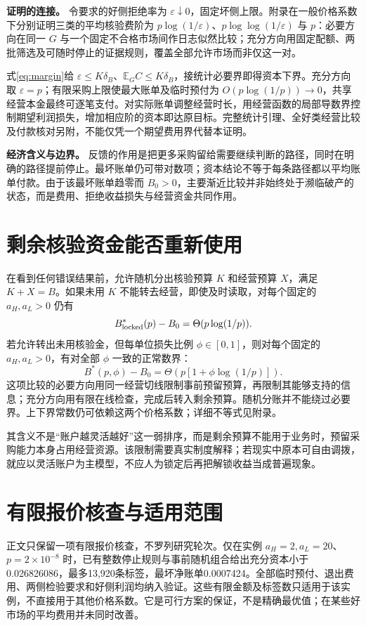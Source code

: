 \documentclass[UTF8,fontset=windows,11pt,a4paper]{ctexart}
\numberwithin{equation}{section}
\begin{document}
\noindent\textbf{证明的连接。}
令要求的好侧拒绝率为 $\varepsilon\downarrow0$，固定坏侧上限。附录在一般价格系数下分别证明三类的平均核验费阶为 $p\log(1/\varepsilon)$、$p\log\log(1/\varepsilon)$ 与 $p$：必要方向在同一 $G$ 与一个固定不合格市场间作日志似然比较；充分方向用固定配额、两批筛选及可随时停止的证据规则，覆盖全部允许市场而非仅这一对。

式\eqref{eq:margin}给 $\varepsilon\le K\delta_B$、$\mathbb E_GC\le K\delta_B$，接统计必要界即得资本下界。充分方向取 $\varepsilon=p$；有限采购上限使最大账单及临时预付为 $O(p\log(1/p))\to0$，共享经营本金最终可逐笔支付。对实际账单调整经营时长，用经营函数的局部导数界控制期望利润损失，增加相应阶的资本即达原目标。完整统计引理、全好类经营比较及付款核对另附，不能仅凭一个期望费用界代替本证明。

\noindent\textbf{经济含义与边界。}
反馈的作用是把更多采购留给需要继续判断的路径，同时在明确的路径提前停止。最坏账单仍可带对数项；资本结论不等于每条路径都以平均账单付款。由于该最坏账单趋零而 $B_0>0$，主要渐近比较并非始终处于濒临破产的状态，而是费用、拒绝收益损失与经营资金共同作用。

\section{剩余核验资金能否重新使用}
在看到任何错误结果前，允许随机分出核验预算 $K$ 和经营预算 $X$，满足 $K+X=B$。如果未用 $K$ 不能转去经营，即使及时读取，对每个固定的 $a_H,a_L>0$ 仍有
\begin{equation}
 B^*_{\rm locked}(p)-B_0=\Theta(p\log(1/p)).
\end{equation}
若允许转出未用核验金，但每单位损失比例 $\phi\in[0,1]$，则对每个固定的 $a_H,a_L>0$，有对全部 $\phi$ 一致的正常数界：
\begin{equation}
 B^*(p,\phi)-B_0=\Theta\!\left(p[1+\phi\log(1/p)]\right).
\end{equation}
这项比较的必要方向用同一经营切线限制事前预留预算，再限制其能够支持的信息；充分方向用有限在线检查，完成后转入剩余预算。随机分账并不能绕过必要界。上下界常数仍可依赖这两个价格系数；详细不等式见附录。

其含义不是“账户越灵活越好”这一弱排序，而是剩余预算不能用于业务时，预留采购能力本身占用经营资源。该限制需要真实制度解释；若现实中原本可自由调拨，就应以灵活账户为主模型，不应人为锁定后再把解锁收益当成普遍现象。

\section{有限报价核查与适用范围}
正文只保留一项有限报价核查，不罗列研究轮次。仅在实例 $a_H=2,a_L=20$、$p=2\times10^{-8}$ 时，已有整数停止规则与事前随机组合给出充分资本小于0.026826086，最多13,920条标签，最坏净账单0.0007424。全部临时预付、退出费用、两侧检验要求和好侧利润均纳入验证。这些有限金额及标签数只适用于该实例，不直接用于其他价格系数。它是可行方案的保证，不是精确最优值；在某些好市场的平均费用并未同时改善。
\end{document}
